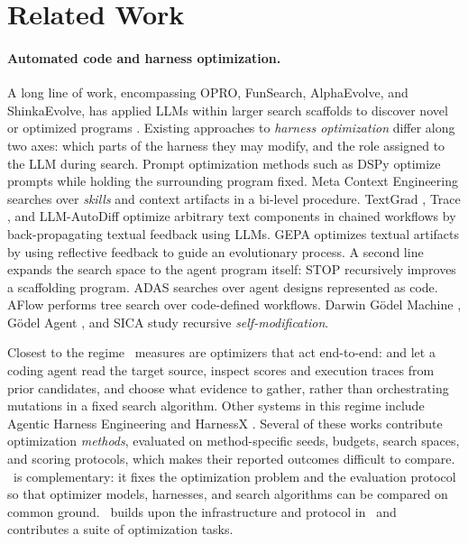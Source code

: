\section{Related Work}
\label{sec:related}

\paragraph{Automated code and harness optimization.}

A long line of work, encompassing OPRO, FunSearch, AlphaEvolve, and ShinkaEvolve, has applied LLMs within larger search scaffolds to discover novel or optimized programs 
\citep{yang2024opro,romera2024funsearch,novikov2025alphaevolve,lange2025shinkaevolveopenendedsampleefficientprogram}. Existing approaches to \emph{harness optimization} differ along two axes: which parts of the harness they may
modify, and the role assigned to the LLM during search. Prompt optimization
methods such as DSPy \citep{khattab2024dspy} optimize prompts while holding the surrounding program fixed. Meta Context Engineering
\citep{ye2026metacontextengineeringagentic} searches over \emph{skills} and context
artifacts in a bi-level procedure. TextGrad
\citep{yuksekgonul2025textgrad}, Trace  \citep{cheng2024trace}, and LLM-AutoDiff
\citep{yin2025adalflow} optimize arbitrary text components in chained workflows by
back-propagating textual feedback using LLMs. GEPA \citep{agrawal2026gepa} optimizes textual artifacts by using
reflective feedback to guide an evolutionary process.  A second line expands the search space to the
agent program itself: STOP \citep{zelikman2024stop} recursively improves a
scaffolding program. ADAS \citep{hu2025adas} searches over agent designs
represented as code. AFlow \citep{zhang2025aflow} performs tree search over
code-defined workflows. Darwin
G\"odel Machine \citep{zhang2026dgm}, G\"odel Agent
\citep{yin2025godelagent}, and SICA
\citep{robeyns2025sica} study recursive \emph{self-modification}.

Closest to the regime \heb\ measures are optimizers that act end-to-end:
\citet{ursekar2026vero} and \citet{lee2026metaharnessendtoendoptimizationmodel} let a coding agent read the target source, inspect
scores and execution traces from prior candidates, and choose what evidence to
gather, rather than orchestrating mutations in a fixed
search algorithm. Other
systems in this regime include Agentic Harness Engineering
\citep{lin2026agenticharness} and HarnessX
\citep{chen2026harnessx}. Several of these works contribute optimization
\emph{methods}, evaluated on method-specific seeds, budgets, search
spaces, and scoring protocols, which makes their reported outcomes difficult to
compare. \heb\ is complementary: it fixes the optimization problem and the
evaluation protocol so that optimizer models, harnesses, and search algorithms can
be compared on common ground. \heb\ builds upon the infrastructure and protocol in 
\vero\ and contributes a suite of optimization tasks. 

